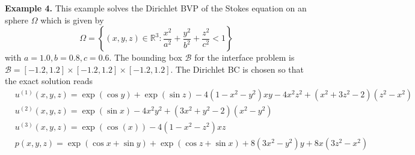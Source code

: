 \fi
\textbf{Example 4.}
 This example solves the Dirichlet BVP of the Stokes equation on an sphere $\Omega$ which is given by
\begin{equation}
\Omega=\left\{(x, y, z) \in \mathbb{R}^3: \frac{x^2}{a^2}+\frac{y^2}{b^2}+\frac{z^2}{c^2}<1\right\}
\label{sphere}
\end{equation}
with $a=1.0, b=0.8, c=0.6$.  The bounding box $\mathcal{B}$ for the interface problem is $\mathcal{B}=[-1.2,1.2] \times[-1.2,1.2] \times[-1.2,1.2]$.   The Dirichlet BC is chosen so that the exact solution reads
\begin{equation}
\begin{aligned}
& u^{(1)}(x, y, z)= \exp (\cos y)+\exp (\sin z)-4\left(1-x^2-y^2\right) x y-4 x^2 z^2+\left(x^2+3 z^2-2\right)\left(z^2-x^2\right) \\
& u^{(2)}(x, y, z)= \exp (\sin x)-4 x^2 y^2+\left(3 x^2+y^2-2\right)\left(x^2-y^2\right)\\
& u^{(3)}(x, y, z)= \exp (\cos (x))-4\left(1-x^2-z^2\right) x z \\
& p(x, y, z)= \exp (\cos x+\sin y)+\exp (\cos z+\sin x)+8  (3  x^2 - y^2)  y + 8  x  (3  z^2 - x^2) \\
&
\end{aligned}
\end{equation}


